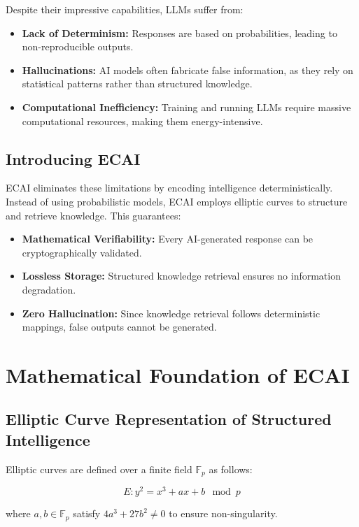 \documentclass{article}
\begin{document}
Despite their impressive capabilities, LLMs suffer from:
\begin{itemize}
    \item \textbf{Lack of Determinism:} Responses are based on probabilities, leading to non-reproducible outputs.
    \item \textbf{Hallucinations:} AI models often fabricate false information, as they rely on statistical patterns rather than structured knowledge.
    \item \textbf{Computational Inefficiency:} Training and running LLMs require massive computational resources, making them energy-intensive.
\end{itemize}

\subsection{Introducing ECAI}

ECAI eliminates these limitations by encoding intelligence deterministically. Instead of using probabilistic models, ECAI employs elliptic curves to structure and retrieve knowledge. This guarantees:
\begin{itemize}
    \item \textbf{Mathematical Verifiability:} Every AI-generated response can be cryptographically validated.
    \item \textbf{Lossless Storage:} Structured knowledge retrieval ensures no information degradation.
    \item \textbf{Zero Hallucination:} Since knowledge retrieval follows deterministic mappings, false outputs cannot be generated.
\end{itemize}

\section{Mathematical Foundation of ECAI}

\subsection{Elliptic Curve Representation of Structured Intelligence}

Elliptic curves are defined over a finite field $\mathbb{F}_p$ as follows:

\begin{equation}
E: y^2 = x^3 + ax + b \mod p
\end{equation}

where $a, b \in \mathbb{F}_p$ satisfy $4a^3 + 27b^2 \neq 0$ to ensure non-singularity.
\end{document}
